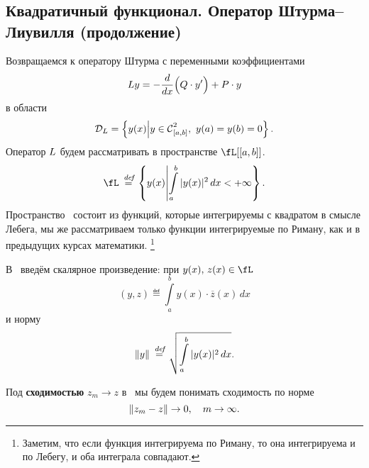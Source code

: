 \chapter{}
\label{lecture5}
\section[Квадратичный функционал. Оператор Штурма (продолжение)]{Квадратичный функционал. Оператор Штурма--Лиувилля (продолжение)}
\label{lecture5section1}
Возвращаемся к оператору Штурма с переменными коэффициентами
\begin{equation}
	\label{l5:eq:1}
	 L{}y=-\frac{d}{dx}\Big(Q\cdot y'\Big)+P\cdot y
\end{equation}
в области 
\begin{equation*}
	\mc{D}_{\LL}=\left\{y(x)\middle|y\in\Cfn[{[a,b]}]{2},\ y(a)=y(b)=0\right\}.
\end{equation*}
Оператор $L$ будем рассматривать в пространстве $\fL[{[a,b]}]$.
\begin{equation*}
	 \fL\eqdef\left\{y(x)\middle|\int\limits_a^b|y(x)|^2\,dx<+\infty\right\}.
\end{equation*}
Пространство \fL\ состоит из функций, которые интегрируемы с квадратом в смысле Лебега, мы же рассматриваем только функции интегрируемые по Риману,  {\mb как и в предыдущих курсах математики.}%
\footnote[1]{Заметим, что если функция интегрируема по Риману, то она интегрируема и по Лебегу{\mb,} и оба интеграла совпадают.}

В \fL\ введём скалярное произведение: при $y(x),\,z(x)\in\fL$
\begin{equation*}
	(y,z)\eqdef\int\limits_a^b y(x)\cdot \overline{z}(x)\,dx
\end{equation*}  
и норму
\begin{equation*}
	\left\|y\right\|\stackrel{\hspace{0.09 cm}de\!f}{=}\sqrt{\int\limits_a^b|y(x)|^2\,dx}.
\end{equation*}
\begin{Def}
	Под \textbf{сходимостью} $z_{m}\to z$ в \fL\ мы будем понимать сходимость по норме
	\begin{equation*}
		\left\|z_m-z\right\|\to0,\quad m\to\infty.
	\end{equation*}
\end{Def}

